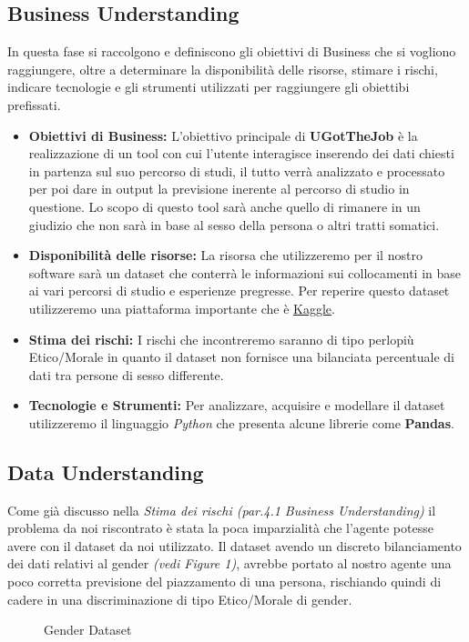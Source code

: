 \documentclass{article}
\newcommand{\mainname}{UGotTheJob}
\begin{document}
\newpage

\subsection{Business Understanding}
In questa fase si raccolgono e definiscono gli obiettivi di Business che si vogliono raggiungere, oltre a determinare
la disponibilità delle risorse, stimare i rischi, indicare tecnologie e gli strumenti utilizzati per raggiungere gli obiettibi
prefissati.

\begin{itemize}
    \item \textbf{Obiettivi di Business:} L'obiettivo principale di \textbf{\mainname} è la realizzazione di un tool con cui l'utente interagisce inserendo
          dei dati chiesti in partenza sul suo percorso di studi, il tutto verrà analizzato e processato per poi dare in
          output la previsione inerente al percorso di studio in questione. Lo scopo di questo tool sarà anche quello di
          rimanere in un giudizio che non sarà in base al sesso della persona o altri tratti somatici.

    \item \textbf{Disponibilità delle risorse:} La risorsa che utilizzeremo per il nostro software sarà un dataset che conterrà
          le informazioni sui collocamenti in base ai vari percorsi di studio e esperienze pregresse. Per reperire questo dataset utilizzeremo una piattaforma importante che è \href{https://www.kaggle.com/}{Kaggle}.

    \item \textbf{Stima dei rischi:} I rischi che incontreremo saranno di tipo perlopiù Etico/Morale in quanto il dataset non fornisce una bilanciata percentuale di dati tra persone di
          sesso differente.

    \item \textbf{Tecnologie e Strumenti:} Per analizzare, acquisire e modellare il dataset utilizzeremo il linguaggio \textit{Python} che presenta alcune librerie come \textbf{Pandas}.

\end{itemize}

\subsection{Data Understanding}
Come già discusso nella \textit{Stima dei rischi (par.4.1 Business Understanding)} il problema da noi riscontrato è stata la poca imparzialità che l'agente potesse avere
con il dataset da noi utilizzato. Il dataset avendo un discreto bilanciamento dei dati relativi al gender \textit{(vedi Figure 1)}, avrebbe portato al nostro agente una poco
corretta previsione del piazzamento di una persona, rischiando quindi di cadere in una discriminazione di tipo Etico/Morale di gender.
\begin{figure}[ht]
    \centering
    \caption{Gender Dataset}
    \label{fig:torta}
\end{figure}
\end{document}
